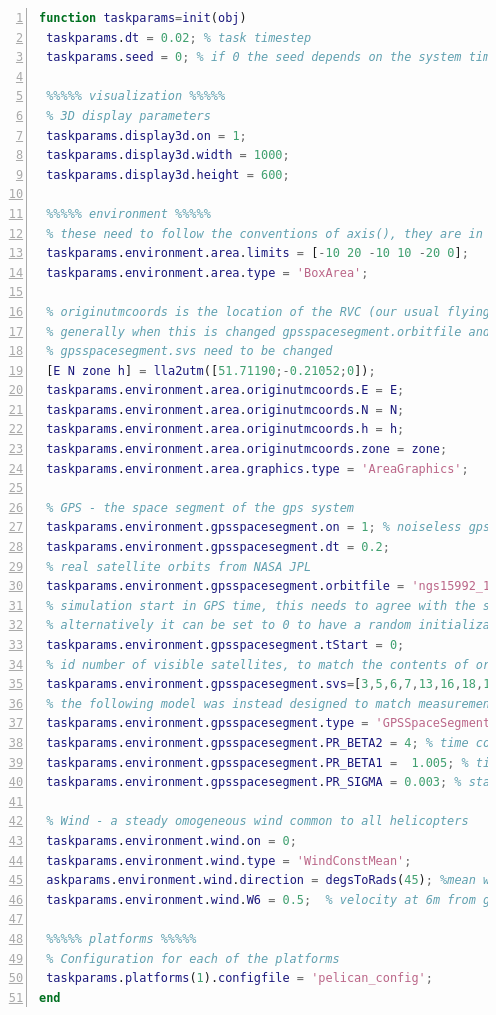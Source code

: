 \documentclass[a4paper,11pt]{report}
\begin{document}
\begin{lstlisting}[float=ht!bp,caption=TaskKeepSpot init() method,language=Matlab,frame=lines,label=lst:init,numbers=left,basicstyle=\small]
function taskparams=init(obj)  
 taskparams.dt = 0.02; % task timestep      
 taskparams.seed = 0; % if 0 the seed depends on the system time
            
 %%%%% visualization %%%%%
 % 3D display parameters
 taskparams.display3d.on = 1;
 taskparams.display3d.width = 1000;
 taskparams.display3d.height = 600;            
            
 %%%%% environment %%%%%
 % these need to follow the conventions of axis(), they are in m, Z down
 taskparams.environment.area.limits = [-10 20 -10 10 -20 0];
 taskparams.environment.area.type = 'BoxArea';
            
 % originutmcoords is the location of the RVC (our usual flying site)
 % generally when this is changed gpsspacesegment.orbitfile and 
 % gpsspacesegment.svs need to be changed
 [E N zone h] = lla2utm([51.71190;-0.21052;0]);
 taskparams.environment.area.originutmcoords.E = E;
 taskparams.environment.area.originutmcoords.N = N;
 taskparams.environment.area.originutmcoords.h = h;
 taskparams.environment.area.originutmcoords.zone = zone;
 taskparams.environment.area.graphics.type = 'AreaGraphics';
            
 % GPS - the space segment of the gps system
 taskparams.environment.gpsspacesegment.on = 1; % noiseless gps if 0
 taskparams.environment.gpsspacesegment.dt = 0.2;
 % real satellite orbits from NASA JPL
 taskparams.environment.gpsspacesegment.orbitfile = 'ngs15992_16to17.sp3';
 % simulation start in GPS time, this needs to agree with the sp3 file above, 
 % alternatively it can be set to 0 to have a random initialization 
 taskparams.environment.gpsspacesegment.tStart = 0;             
 % id number of visible satellites, to match the contents of orbitfile
 taskparams.environment.gpsspacesegment.svs=[3,5,6,7,13,16,18,19,20,22,24,29,31];
 % the following model was instead designed to match measurements of real data
 taskparams.environment.gpsspacesegment.type = 'GPSSpaceSegmentGM2';            
 taskparams.environment.gpsspacesegment.PR_BETA2 = 4; % time constant
 taskparams.environment.gpsspacesegment.PR_BETA1 =  1.005; % time constant   
 taskparams.environment.gpsspacesegment.PR_SIGMA = 0.003; % standard deviation            
            
 % Wind - a steady omogeneous wind common to all helicopters
 taskparams.environment.wind.on = 0;
 taskparams.environment.wind.type = 'WindConstMean';
 askparams.environment.wind.direction = degsToRads(45); %mean wind direction
 taskparams.environment.wind.W6 = 0.5;  % velocity at 6m from ground in m/s
            
 %%%%% platforms %%%%%
 % Configuration for each of the platforms
 taskparams.platforms(1).configfile = 'pelican_config';
end
\end{lstlisting}
\end{document}
